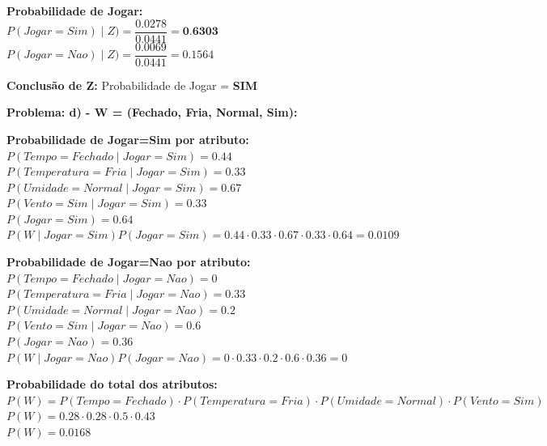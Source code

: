 \documentclass{article}
\begin{document}
  \begin{tabbing}
    \textbf{Probabilidade de Jogar:}\\
    $P(Jogar=Sim) \mid Z) = \dfrac{0.0278}{0.0441} = \textbf{0.6303}$ \\
    $P(Jogar=Nao) \mid Z) = \dfrac{0.0069}{0.0441} = 0.1564$
  \end{tabbing}

  \begin{tabbing}
    \textbf{Conclusão de Z:}
    Probabilidade de Jogar = \textbf{SIM} \\
  \end{tabbing} 

  \textbf{\large Problema: d) - W = (Fechado, Fria, Normal, Sim):}
  
  \begin{tabbing}
    \textbf{Probabilidade de Jogar=Sim por atributo:}\\
    $P(Tempo=Fechado \mid Jogar = Sim) =  0.44 $ \\
    $P(Temperatura=Fria \mid Jogar = Sim)  = 0.33 $ \\
    $P(Umidade=Normal \mid Jogar = Sim)  = 0.67 $ \\
    $P(Vento=Sim \mid Jogar = Sim) = 0.33 $ \\
    $P(Jogar=Sim) = 0.64$ \\
    $P(W \mid Jogar=Sim)P(Jogar=Sim) = 0.44 \cdot 0.33 \cdot 0.67 \cdot 0.33 \cdot 0.64 = 0.0109$ \\
  \end{tabbing}

  \begin{tabbing}
    \textbf{Probabilidade de Jogar=Nao por atributo:}\\
    $P(Tempo=Fechado \mid Jogar = Nao) =  0 $ \\
    $P(Temperatura=Fria \mid Jogar = Nao)  = 0.33 $ \\
    $P(Umidade=Normal \mid Jogar = Nao)  = 0.2 $ \\
    $P(Vento=Sim \mid Jogar = Nao) = 0.6 $ \\
    $P(Jogar=Nao) = 0.36$ \\
    $P(W \mid Jogar=Nao)P(Jogar=Nao) = 0 \cdot 0.33 \cdot 0.2 \cdot 0.6 \cdot 0.36 = 0$ \\
  \end{tabbing}

  \begin{tabbing}
    \textbf{Probabilidade do total dos atributos:}\\
    $P(W) = P(Tempo=Fechado) \cdot P(Temperatura=Fria) \cdot P(Umidade=Normal) \cdot P(Vento=Sim)$ \\
    $P(W) = 0.28 \cdot 0.28 \cdot 0.5 \cdot 0.43$ \\
    $P(W) = 0.0168$  
  \end{tabbing}
  
\end{document}
